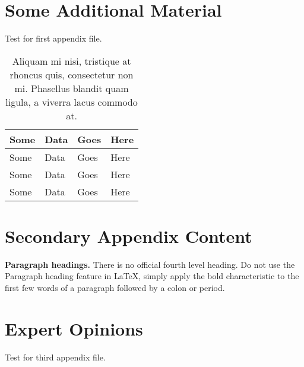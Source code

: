 \chapter{Some Additional Material}

Test for first appendix file.

\begin{table}[h]
\caption[Aliquam mi nisi]{Aliquam mi nisi, tristique at rhoncus quis, consectetur non mi. Phasellus blandit quam ligula, a viverra lacus commodo at.}
\begin{tabularx}{\textwidth}{XXXX}\hline
Some    & Data  & Goes  & Here\\\hline
Some    & Data  & Goes  & Here\\
Some    & Data  & Goes  & Here\\
Some    & Data  & Goes  & Here\\\hline
\end{tabularx}

\end{table}


\chapter{Secondary Appendix Content}

{\bf Paragraph headings.} There is no official fourth level heading. Do not use the Paragraph heading feature in LaTeX, simply apply the bold characteristic to the first few words of a paragraph followed by a colon or period.


\chapter{Expert Opinions}

Test for third appendix file.


